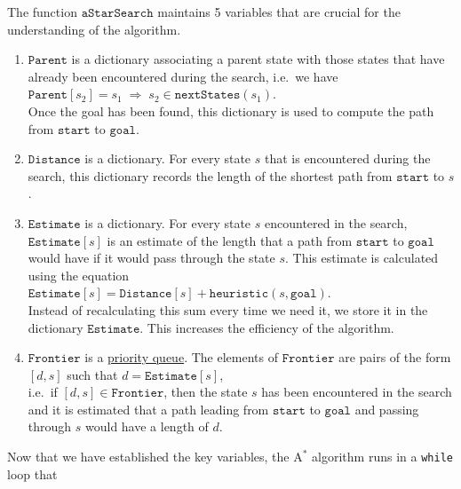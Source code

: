 The function $\mathtt{aStarSearch}$ maintains 5 variables that are crucial for the understanding of the
algorithm. 
\begin{enumerate}
\item $\mathtt{Parent}$ is a dictionary associating a parent state with those states that have already been
      encountered during the search, i.e.~we have
      \\[0.2cm]
      \hspace*{1.3cm}
      $\mathtt{Parent}[s_2] = s_1 \;\Rightarrow\; s_2 \in \mathtt{nextStates}(s_1)$.
      \\[0.2cm]
      Once the goal has been found, this dictionary is used to compute the path from $\mathtt{start}$ to
      $\mathtt{goal}$. 
\item $\mathtt{Distance}$ is a dictionary.  For every state $s$ that is encountered during the
      search,  this dictionary records the length of the shortest path from $\mathtt{start}$ to $s$.
\item $\mathtt{Estimate}$ is a dictionary.  For every state $s$ encountered in the search, $\mathtt{Estimate}[s]$
      is an estimate of the length that a path from $\mathtt{start}$ to $\mathtt{goal}$ would have if it would
      pass through the state $s$.  This estimate is calculated using the equation
      \\[0.2cm]
      \hspace*{1.3cm}
      $\mathtt{Estimate}[s] = \mathtt{Distance}[s] + \mathtt{heuristic}(s, \mathtt{goal})$.
      \\[0.2cm]
      Instead of recalculating this sum every time we need it, we store it in the dictionary
      $\mathtt{Estimate}$.  This increases the efficiency of the algorithm.
\item $\mathtt{Frontier}$ is a \href{https://en.wikipedia.org/wiki/Priority_queue}{priority queue}.
      The elements of $\mathtt{Frontier}$ are pairs of the form
      \\[0.2cm]
      \hspace*{1.3cm}
      $[d, s]$ \quad such that \quad $d = \mathtt{Estimate}[s]$,
      \\[0.2cm]
      i.e.~if $[d, s] \in \mathtt{Frontier}$, then the state $s$ has been encountered in the search and it is
      estimated that a path leading from $\mathtt{start}$ to $\mathtt{goal}$ and passing through $s$ would have
      a length of $d$.
\end{enumerate}
Now that we have established the key variables, the $\mathrm{A}^*$ algorithm runs in a \texttt{while} loop that
